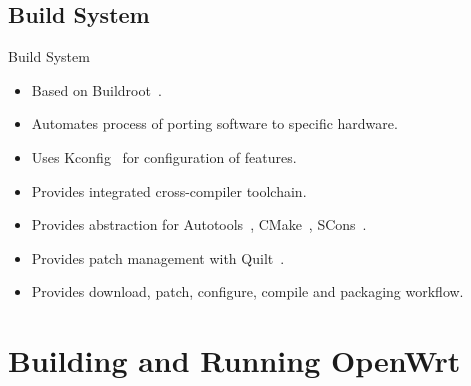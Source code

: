 \subsection{Build System}
\begin{frame}{Build System}
    \begin{itemize}[<+(1)->]
        \item Based on Buildroot~\cite{buildroot}.
        \item Automates process of porting software to specific hardware.
        \item Uses Kconfig~\cite{linux-kconfig} for configuration of features.
        \item Provides integrated cross-compiler toolchain.
        \item Provides abstraction for Autotools~\cite{gnu-autotools}, CMake~\cite{kitware-cmake}, SCons~\cite{scons}.
        \item Provides patch management with Quilt~\cite{fsf-quilt}.
        \item Provides download, patch, configure, compile and packaging workflow.
    \end{itemize}
\end{frame}

\section{Building and Running OpenWrt}

